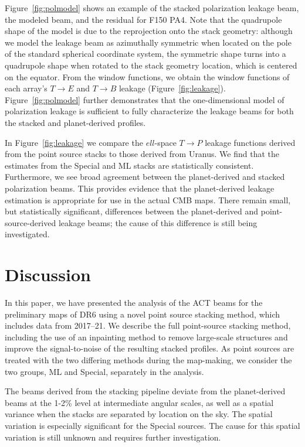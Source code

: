 Figure~\ref{fig:polmodel} shows an example of the stacked polarization leakage beam, the modeled beam, and the residual for F150 PA4. Note that the quadrupole shape of the model is due to the reprojection onto the stack geometry: although we model the leakage beam as azimuthally symmetric when located on the pole of the standard spherical coordinate system, the symmetric shape turns into a quadrupole shape when rotated to the stack geometry location, which is centered on the equator. From the window functions, we obtain the window functions of each array's $T\rightarrow E$ and $T\rightarrow B$ leakage (Figure~\ref{fig:leakage}).  Figure~\ref{fig:polmodel} further demonstrates that the one-dimensional model of polarization leakage is sufficient to fully characterize the leakage beams for both the stacked and planet-derived profiles.

In Figure~\ref{fig:leakage} we compare the $ell$-space $T\rightarrow P$ leakage functions derived from the point source stacks to those derived from Uranus. We find that the estimates from the Special and ML stacks are statistically consistent. Furthermore, we see broad agreement between the planet-derived and stacked polarization beams.  This provides evidence that the planet-derived leakage estimation is appropriate for use in the actual CMB maps. There remain small, but statistically significant, differences between the planet-derived and point-source-derived leakage beams; the cause of this difference is still being investigated.

\section{Discussion}
\label{sec:act_disc}
In this paper, we have presented the analysis of the ACT beams for the preliminary maps of DR6 using a novel point source stacking method, which includes data from 2017--21.  We describe the full point-source stacking method, including the use of an inpainting method to remove large-scale structures and improve the signal-to-noise of the resulting stacked profiles.  As point sources are treated with the two differing methods during the map-making, we consider the two groups, ML and Special, separately in the analysis.

The beams derived from the stacking pipeline deviate from the planet-derived beams at the 1-2\% level at intermediate angular scales, as well as a spatial variance when the stacks are separated by location on the sky.  The spatial variation is especially significant for the Special sources. The cause for this spatial variation is still unknown and requires further investigation.


